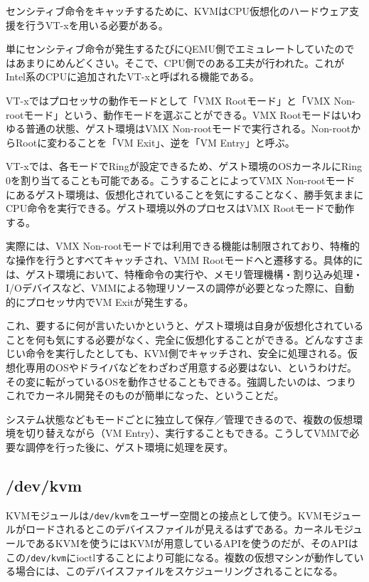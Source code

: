 ﻿\documentclass[9pt,b5paper,tombo,openany]{jsbook}
\begin{document}
センシティブ命令をキャッチするために、KVMはCPU仮想化のハードウェア支援を行うVT-xを用いる必要がある。

単にセンシティブ命令が発生するたびにQEMU側でエミュレートしていたのではあまりにめんどくさい。そこで、CPU側でのある工夫が行われた。これがIntel系のCPUに追加されたVT-xと呼ばれる機能である。

VT-xではプロセッサの動作モードとして「VMX Rootモード」と「VMX Non-rootモード」という、動作モードを選ぶことができる。VMX Rootモードはいわゆる普通の状態、ゲスト環境はVMX Non-rootモードで実行される。Non-rootからRootに変わることを「VM Exit」、逆を「VM Entry」と呼ぶ。

VT-xでは、各モードでRingが設定できるため、ゲスト環境のOSカーネルにRing 0を割り当てることも可能である。こうすることによってVMX Non-rootモードにあるゲスト環境は、仮想化されていることを気にすることなく、勝手気ままにCPU命令を実行できる。ゲスト環境以外のプロセスはVMX Rootモードで動作する。

実際には、VMX Non-rootモードでは利用できる機能は制限されており、特権的な操作を行うとすべてキャッチされ、VMM Rootモードへと遷移する。具体的には、ゲスト環境において、特権命令の実行や、メモリ管理機構・割り込み処理・I/Oデバイスなど、VMMによる物理リソースの調停が必要となった際に、自動的にプロセッサ内でVM Exitが発生する。

これ、要するに何が言いたいかというと、ゲスト環境は自身が仮想化されていることを何も気にする必要がなく、完全に仮想化することができる。どんなすさまじい命令を実行したとしても、KVM側でキャッチされ、安全に処理される。仮想化専用のOSやドライバなどをわざわざ用意する必要はない、というわけだ。その変に転がっているOSを動作させることもできる。強調したいのは、つまりこれでカーネル開発そのものが簡単になった、ということだ。

システム状態などもモードごとに独立して保存／管理できるので、複数の仮想環境を切り替えながら（VM Entry）、実行することもできる。こうしてVMMで必要な調停を行った後に、ゲスト環境に処理を戻す。

\subsection{/dev/kvm}

KVMモジュールは\verb|/dev/kvm|をユーザー空間との接点として使う。KVMモジュールがロードされるとこのデバイスファイルが見えるはずである。カーネルモジュールであるKVMを使うにはKVMが用意しているAPIを使うのだが、そのAPIはこの\verb|/dev/kvm|にioctlすることにより可能になる。複数の仮想マシンが動作している場合には、このデバイスファイルをスケジューリングされることになる。
\end{document}
